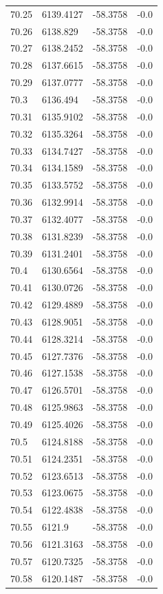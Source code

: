 \begin{table}[H]
\begin{tabular}{llll}
70.25 & 6139.4127 & -58.3758 & -0.0 \\
70.26 & 6138.829 & -58.3758 & -0.0 \\
70.27 & 6138.2452 & -58.3758 & -0.0 \\
70.28 & 6137.6615 & -58.3758 & -0.0 \\
70.29 & 6137.0777 & -58.3758 & -0.0 \\
70.3 & 6136.494 & -58.3758 & -0.0 \\
70.31 & 6135.9102 & -58.3758 & -0.0 \\
70.32 & 6135.3264 & -58.3758 & -0.0 \\
70.33 & 6134.7427 & -58.3758 & -0.0 \\
70.34 & 6134.1589 & -58.3758 & -0.0 \\
70.35 & 6133.5752 & -58.3758 & -0.0 \\
70.36 & 6132.9914 & -58.3758 & -0.0 \\
70.37 & 6132.4077 & -58.3758 & -0.0 \\
70.38 & 6131.8239 & -58.3758 & -0.0 \\
70.39 & 6131.2401 & -58.3758 & -0.0 \\
70.4 & 6130.6564 & -58.3758 & -0.0 \\
70.41 & 6130.0726 & -58.3758 & -0.0 \\
70.42 & 6129.4889 & -58.3758 & -0.0 \\
70.43 & 6128.9051 & -58.3758 & -0.0 \\
70.44 & 6128.3214 & -58.3758 & -0.0 \\
70.45 & 6127.7376 & -58.3758 & -0.0 \\
70.46 & 6127.1538 & -58.3758 & -0.0 \\
70.47 & 6126.5701 & -58.3758 & -0.0 \\
70.48 & 6125.9863 & -58.3758 & -0.0 \\
70.49 & 6125.4026 & -58.3758 & -0.0 \\
70.5 & 6124.8188 & -58.3758 & -0.0 \\
70.51 & 6124.2351 & -58.3758 & -0.0 \\
70.52 & 6123.6513 & -58.3758 & -0.0 \\
70.53 & 6123.0675 & -58.3758 & -0.0 \\
70.54 & 6122.4838 & -58.3758 & -0.0 \\
70.55 & 6121.9 & -58.3758 & -0.0 \\
70.56 & 6121.3163 & -58.3758 & -0.0 \\
70.57 & 6120.7325 & -58.3758 & -0.0 \\
70.58 & 6120.1487 & -58.3758 & -0.0 \\

\end{tabular}
\end{table}
